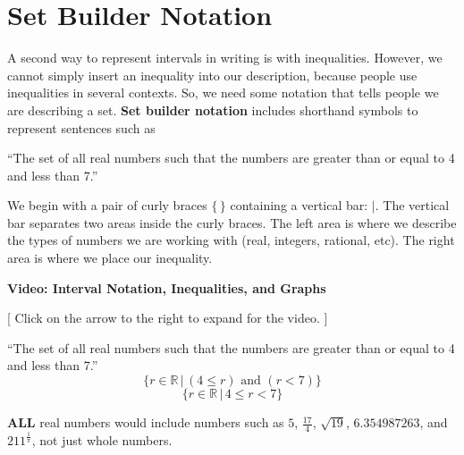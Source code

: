 \documentclass{ximera}
\begin{document}
\section{Set Builder Notation}

A second way to represent intervals in writing is with inequalities. However, we cannot simply insert an inequality into our description, because people use inequalities in several contexts.  So, we need some notation that tells people we are describing a set. \textbf{Set builder notation} includes shorthand symbols to represent sentences such as 

\begin{center}
``The set of all real numbers such that the numbers are greater than or equal to 4 and less than 7.''
\end{center}

We begin with a pair of curly braces $\{  \, \}$ containing a vertical bar:  ${|}$.  The vertical bar separates two areas inside the curly braces. The left area is where we describe the types of numbers we are working with (real, integers, rational, etc).  The right area is where we place our inequality.





\begin{explanation} \textbf{Video: Interval Notation, Inequalities, and Graphs}

[ Click on the arrow to the right to expand for the video. ]
\begin{expandable} 

\begin{center}
\end{center}

\end{expandable}
\end{explanation}





\begin{example}
``The set of all real numbers such that the numbers are greater than or equal to 4 and less than 7.''
\[ \{ r \in \mathbb {R} \, | \, (4 \leq r)  \text{ and } (r < 7) \} \]
\[ \{ r \in \mathbb {R} \, | \, 4 \leq r < 7 \} \]

\begin{warning}
\textbf{ALL} real numbers would include numbers such as $5$, $\frac{17}{4}$, $\sqrt{19}$, $6.354987263$, and $211^{\tfrac{1}{\pi}}$, not just whole numbers.
\end{warning}
\end{example}
\end{document}
